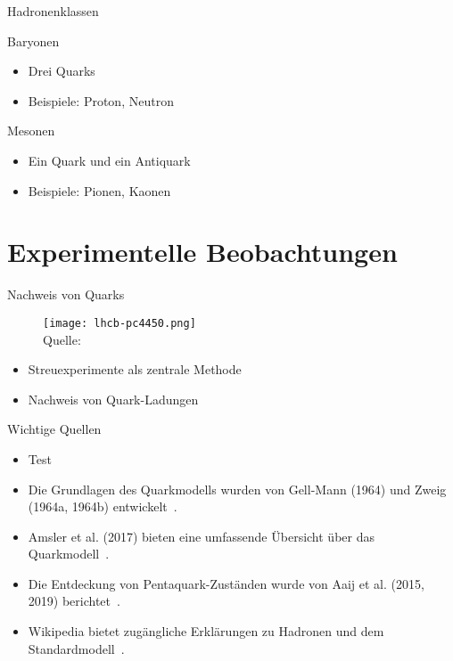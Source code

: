 \documentclass[aspectratio=169]{beamer} %
\newcommand{\figcite}[1]{\\[-3mm]{\scriptsize Quelle: \cite{#1}}}
\begin{document}
    \begin{frame}{Hadronenklassen}
        \begin{block}{Baryonen}
            \begin{itemize}
                \item Drei Quarks
                \item Beispiele: Proton, Neutron
            \end{itemize}
        \end{block}
        \begin{block}{Mesonen}
            \begin{itemize}
                \item Ein Quark und ein Antiquark
                \item Beispiele: Pionen, Kaonen
            \end{itemize}
        \end{block}
    \end{frame}
    
    \section{Experimentelle Beobachtungen}
    \begin{frame}{Nachweis von Quarks}
        \begin{figure}
            \centering
            \texttt{[image: lhcb-pc4450.png]}
            \figcite{Aaij.2019}
        \end{figure}
        \begin{itemize}
            \item Streuexperimente als zentrale Methode
            \item Nachweis von Quark-Ladungen
        \end{itemize}
    \end{frame}
    
    \begin{frame}{Wichtige Quellen}
        \begin{itemize}
          \item Test
            \item Die Grundlagen des Quarkmodells wurden von Gell-Mann (1964) und Zweig (1964a, 1964b) entwickelt~\cite{GellMann.1964, Zweig.1964, Zweig.1964b}.
            \item Amsler et al. (2017) bieten eine umfassende Übersicht über das Quarkmodell~\cite{C.Amsler.2017}.
            \item Die Entdeckung von Pentaquark-Zuständen wurde von Aaij et al. (2015, 2019) berichtet~\cite{Aaij.2019}.
            \item Wikipedia bietet zugängliche Erklärungen zu Hadronen und dem Standardmodell~\cite{Wikipedia.Hadron, Wikipedia.Standardmodell}.
        \end{itemize}
    \end{frame}
    
\end{document}
